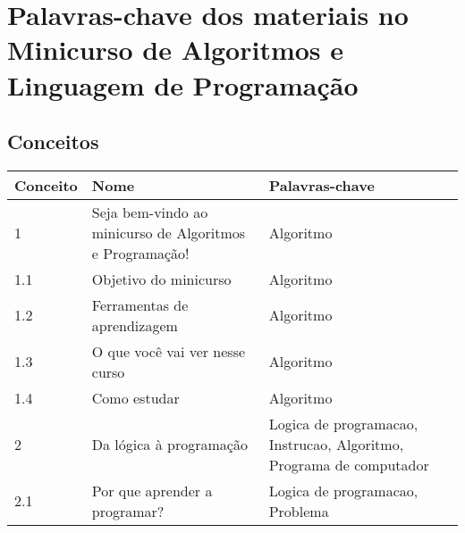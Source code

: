 \chapter{Palavras-chave dos materiais no Minicurso de Algoritmos e Linguagem de Programação}\label{ape:palavras-chave-materiais}

\section{Conceitos}

\begin{longtable}{| p{} | p{} | p{} |}
\hline
Conceito & Nome                                                     & Palavras-chave                                                                                                                \\ \hline
1        & Seja bem-vindo ao minicurso de Algoritmos e Programação! & Algoritmo                                                                                                                     \\ \hline
1.1      & Objetivo do minicurso                                    & Algoritmo                                                                                                                     \\ \hline
1.2      & Ferramentas de aprendizagem                              & Algoritmo                                                                                                                     \\ \hline
1.3      & O que você vai ver nesse curso                           & Algoritmo                                                                                                                     \\ \hline
1.4      & Como estudar                                             & Algoritmo                                                                                                                     \\ \hline
2        & Da lógica à programação                                  & Logica de programacao, Instrucao, Algoritmo, Programa de computador                                                           \\ \hline
2.1      & Por que aprender a programar?                            & Logica de programacao, Problema                                                                                               \\ \hline

\end{longtable}
